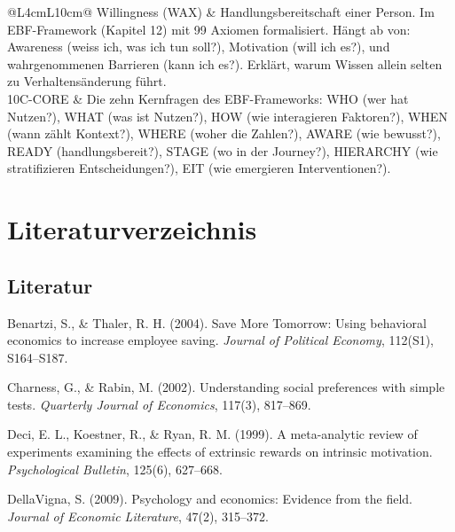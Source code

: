 \documentclass[11pt,a4paper]{article}
\begin{document}
\begin{longtable}{@{}L{4cm}L{10cm}@{}}
\midrule
Willingness (WAX) & Handlungsbereitschaft einer Person. Im EBF-Framework (Kapitel 12) mit 99 Axiomen formalisiert. Hängt ab von: Awareness (weiss ich, was ich tun soll?), Motivation (will ich es?), und wahrgenommenen Barrieren (kann ich es?). Erklärt, warum Wissen allein selten zu Verhaltensänderung führt. \\
\midrule
10C-CORE & Die zehn Kernfragen des EBF-Frameworks: WHO (wer hat Nutzen?), WHAT (was ist Nutzen?), HOW (wie interagieren Faktoren?), WHEN (wann zählt Kontext?), WHERE (woher die Zahlen?), AWARE (wie bewusst?), READY (handlungsbereit?), STAGE (wo in der Journey?), HIERARCHY (wie stratifizieren Entscheidungen?), EIT (wie emergieren Interventionen?). \\
\bottomrule
\end{longtable}

\newpage


\section*{Literaturverzeichnis}

\subsection*{Literatur}

Benartzi, S., \& Thaler, R. H. (2004). Save More Tomorrow: Using behavioral economics to increase employee saving. \textit{Journal of Political Economy}, 112(S1), S164--S187.

\vspace{0.3cm}
Charness, G., \& Rabin, M. (2002). Understanding social preferences with simple tests. \textit{Quarterly Journal of Economics}, 117(3), 817--869.

\vspace{0.3cm}
Deci, E. L., Koestner, R., \& Ryan, R. M. (1999). A meta-analytic review of experiments examining the effects of extrinsic rewards on intrinsic motivation. \textit{Psychological Bulletin}, 125(6), 627--668.

\vspace{0.3cm}
DellaVigna, S. (2009). Psychology and economics: Evidence from the field. \textit{Journal of Economic Literature}, 47(2), 315--372.
\end{document}
